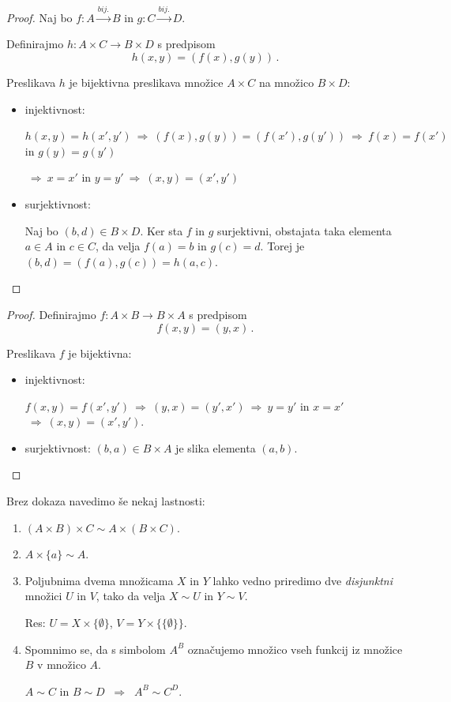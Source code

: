 \documentclass[11pt,paper=b5,DIV=13,headinclude,footinclude]{scrbook}
\def\sledi {{~\Rightarrow~}}
\begin{document}
\bigskip

\framebox{$A\sim B$ in $C\sim D$
$\sledi$ $A\times C\sim B\times D$}

\begin{proof} Naj bo $f:A\overset{bij.}{\to}B$ in $g:C\overset{bij.}{\to}D$.

Definirajmo $h:A\times C\to B \times D$ s predpisom
$$h(x,y) = (f(x),g(y))\,.$$

Preslikava $h$ je bijektivna preslikava množice $A\times C$ na množico $B\times D$:
\begin{itemize}
  \item injektivnost:

  $h(x,y) = h(x',y')\sledi
  (f(x),g(y)) = (f(x'),g(y')) \sledi f(x) = f(x')$ in $g(y) = g(y')$

  $\sledi x = x'$ in $y = y' \sledi (x,y) = (x',y')$
  \item surjektivnost:

  Naj bo $(b,d)\in B\times D$. Ker sta $f$ in $g$ surjektivni, obstajata taka elementa $a\in A$
  in $c\in C$, da velja $f(a) = b$ in $g(c) = d$. Torej je $(b,d) = (f(a),g(c)) = h(a,c)$.
\end{itemize}
\end{proof}

\bigskip

\newpage
{}


\begin{proof} Definirajmo  $f:A\times B\to B\times A$ s predpisom
$$f(x,y) = (y,x)\,.$$

Preslikava $f$ je bijektivna:
\begin{itemize}
  \item injektivnost:

  $f(x,y) = f(x',y') \sledi (y,x) = (y',x') \sledi y = y'$ in $x = x'$ $\sledi (x,y) = (x',y')$.

  \item surjektivnost: $(b,a)\in B\times A$ je slika elementa $(a,b)$.
\end{itemize}
\end{proof}

Brez dokaza navedimo še nekaj lastnosti:
\begin{enumerate}
  \item $(A\times B)\times C\sim A\times (B\times C)$.
  \item $A\times \{a\}\sim A$.
  \item Poljubnima dvema množicama $X$ in $Y$ lahko vedno priredimo dve {\em disjunktni} množici
  $U$ in $V$, tako da velja $X\sim U$ in $Y\sim V$.

  Res: $U = X\times\{\emptyset\}$, $V = Y\times\{\{\emptyset\}\}$.
  \item Spomnimo se, da s simbolom $A^B$ označujemo množico vseh funkcij iz množice $B$ v množico $A$.

  $A\sim C$ in $B\sim D$ $\sledi$ $A^B\sim C^D$.
\end{enumerate}
\end{document}
